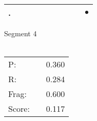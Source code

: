 \documentclass[landscape]{article}
\newcommand{\ssp}{\hspace{2pt}}
\newcommand{\mex}{\cellcolor{g}$\bullet$}
\begin{document}
\begin{tabular}{|l|p{10pt}|p{10pt}|p{10pt}|p{10pt}|p{10pt}|p{10pt}|p{10pt}|p{10pt}|p{10pt}|}
\hline
\ssp \cellcolor{ref8}. \ssp&\hspace{2pt}&\hspace{2pt}&\hspace{2pt}&\hspace{2pt}&\hspace{2pt}&\hspace{2pt}&\hspace{2pt}&\hspace{2pt}&\hspace{2pt}\mex\\
\hline
\end{tabular}

\vspace{6pt}
\noindent Segment 4\\\\
\noindent\begin{tabular}{lm{12pt}r}
\hline
P:&&0.360\\
R:&&0.284\\
Frag:&&0.600\\
Score:&&0.117\\
\end{tabular}

\newpage
\end{document}
